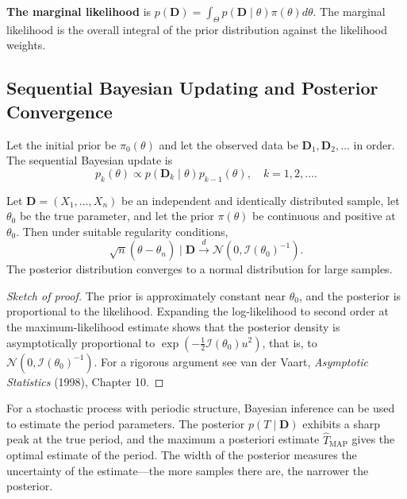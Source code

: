 \begin{definition}\label{def:marginal_likelihood}
\textbf{The marginal likelihood} is $p(\mathbf{D}) = \int_{\Theta} p(\mathbf{D} \mid \theta) \pi(\theta) d\theta$. The marginal likelihood is the overall integral of the prior distribution against the likelihood weights.
\end{definition}

\subsection{Sequential Bayesian Updating and Posterior Convergence}

\begin{definition}\label{def:sequential_bayesian}
Let the initial prior be $\pi_0(\theta)$ and let the observed data be $\mathbf{D}_1, \mathbf{D}_2, \dots$ in order. The sequential Bayesian update is
\[
p_k(\theta) \propto p(\mathbf{D}_k \mid \theta) p_{k-1}(\theta), \quad k = 1, 2, \dots.
\]
\end{definition}

\begin{theorem}\label{thm:bernstein_von_mises}
Let $\mathbf{D} = (X_1, \dots, X_n)$ be an independent and identically distributed sample, let $\theta_0$ be the true parameter, and let the prior $\pi(\theta)$ be continuous and positive at $\theta_0$. Then under suitable regularity conditions,
\[
\sqrt{n}(\theta - \hat{\theta}_n) \mid \mathbf{D} \xrightarrow{d} \mathcal{N}(0, \mathcal{I}(\theta_0)^{-1}).
\]
The posterior distribution converges to a normal distribution for large samples.
\end{theorem}

\begin{proof}[Sketch of proof]
The prior is approximately constant near $\theta_0$, and the posterior is proportional to the likelihood. Expanding the log-likelihood to second order at the maximum-likelihood estimate shows that the posterior density is asymptotically proportional to $\exp(-\tfrac12 \mathcal{I}(\theta_0) u^2)$, that is, to $\mathcal{N}(0, \mathcal{I}(\theta_0)^{-1})$. For a rigorous argument see van der Vaart, \emph{Asymptotic Statistics} (1998), Chapter 10.
\end{proof}

\begin{proposition}\label{prop:bayesian_periodic_diagnosis}
For a stochastic process with periodic structure, Bayesian inference can be used to estimate the period parameters. The posterior $p(T \mid \mathbf{D})$ exhibits a sharp peak at the true period, and the maximum a posteriori estimate $\hat{T}_{\text{MAP}}$ gives the optimal estimate of the period. The width of the posterior measures the uncertainty of the estimate---the more samples there are, the narrower the posterior.
\end{proposition}


